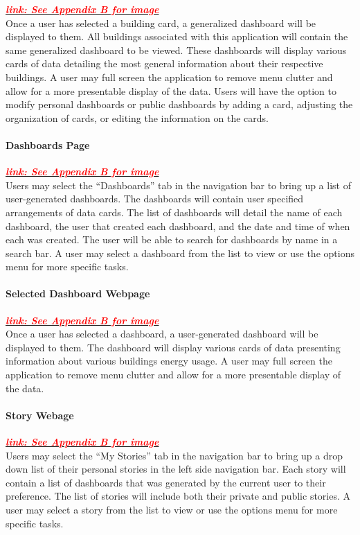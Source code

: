 \textbf{\textit{\hyperref[sec:selected_buildings]{\textcolor{red}{link: See Appendix B for image}}}}\\  

Once a user has selected a building card, a generalized dashboard will be displayed to them.
All buildings associated with this application will contain the same generalized dashboard to be viewed.
These dashboards will display various cards of data detailing the most general information about their respective buildings.
A user may full screen the application to remove menu clutter and allow for a more presentable display of the data. 
Users will have the option to modify personal dashboards or public dashboards by adding a card, adjusting the organization of cards, or editing the information on the cards.

\paragraph{Dashboards Page}

\textbf{\textit{\hyperref[sec:dashboards]{\textcolor{red}{link: See Appendix B for image}}}}\\ 

Users may select the ``Dashboards'' tab in the navigation bar to bring up a list of user-generated dashboards.
The dashboards will contain user specified arrangements of data cards. 
The list of dashboards will detail the name of each dashboard, the user that created each dashboard, and the date and time of when each was created.
The user will be able to search for dashboards by name in a search bar. 
A user may select a dashboard from the list to view or use the options menu for more specific tasks.

\paragraph{Selected Dashboard Webpage}

\textbf{\textit{\hyperref[sec:selected_dashboards]{\textcolor{red}{link: See Appendix B for image}}}}\\

Once a user has selected a dashboard, a user-generated dashboard will be displayed to them.
The dashboard will display various cards of data presenting information about various buildings energy usage.
A user may full screen the application to remove menu clutter and allow for a more presentable display of the data.

\paragraph{Story Webage}

\textbf{\textit{\hyperref[sec:story]{\textcolor{red}{link: See Appendix B for image}}}}\\ 

Users may select the ``My Stories'' tab in the navigation bar to bring up a drop down list of their personal stories in the left side navigation bar.
Each story will contain a list of dashboards that was generated by the current user to their preference. 
The list of stories will include both their private and public stories.
A user may select a story from the list to view or use the options menu for more specific tasks.